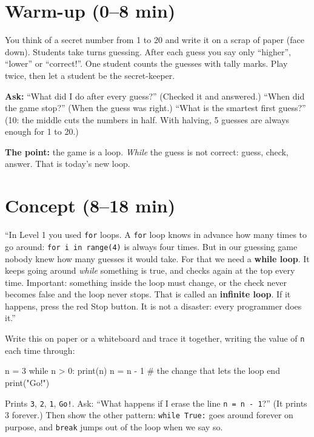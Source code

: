 \section{Warm-up (0--8 min)}
\begin{unplugged}
You think of a secret number from 1 to 20 and write it on a scrap of paper (face down). Students take turns guessing.
After each guess you say only \enquote{higher}, \enquote{lower} or \enquote{correct!}. One student counts the guesses with tally marks.
Play twice, then let a student be the secret-keeper.
\par\textbf{Ask:} \enquote{What did I do after every guess?} (Checked it and answered.) \enquote{When did the game stop?} (When the guess was right.)
\enquote{What is the smartest first guess?} (10: the middle cuts the numbers in half. With halving, 5 guesses are always enough for 1 to 20.)
\par\textbf{The point:} the game is a loop. \emph{While} the guess is not correct: guess, check, answer. That is today's new loop.
\end{unplugged}

\section{Concept (8--18 min)}
\begin{teacherscript}[Say]
\enquote{In Level 1 you used \texttt{for} loops. A \texttt{for} loop knows in advance how many times to go around: \texttt{for i in range(4)} is
always four times. But in our guessing game nobody knew how many guesses it would take. For that we need a
\textbf{while loop}. It keeps going around \emph{while} something is true, and checks again at the top every time.
Important: something inside the loop must change, or the check never becomes false and the loop never stops.
That is called an \textbf{infinite loop}. If it happens, press the red Stop button. It is not a disaster: every programmer does it.}
\end{teacherscript}
Write this on paper or a whiteboard and trace it together, writing the value of \texttt{n} each time through:
\begin{pycode}
n = 3
while n > 0:
    print(n)
    n = n - 1        # the change that lets the loop end
print("Go!")
\end{pycode}
Prints \texttt{3}, \texttt{2}, \texttt{1}, \texttt{Go!}. Ask: \enquote{What happens if I erase the line \texttt{n = n - 1}?} (It prints 3 forever.)
Then show the other pattern: \texttt{while True:} goes around forever on purpose, and \texttt{break} jumps out of the loop when we say so.

